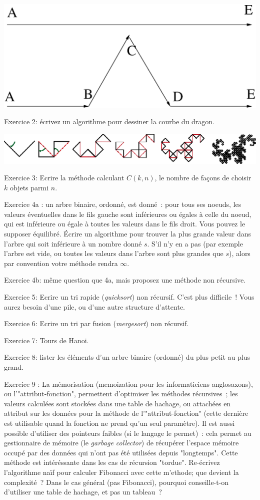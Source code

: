 \documentclass[a4paper]{article}
\begin{document}
\begin{center}
\includegraphics[width=0.4\linewidth]{vonkoch.eps}
\end{center}

Exercice 2:  \'ecrivez un algorithme pour dessiner la courbe du dragon.

\begin{center}
\includegraphics[width=0.8\linewidth]{dragon.eps}
\end{center}

Exercice 3: Ecrire la m\'ethode calculant 
$C(k, n)$, le nombre de fa\c{c}ons de choisir $k$ objets parmi $n$.

Exercice 4a : un arbre binaire, ordonn\'e, est donn\'e~: pour tous ses noeuds, les valeurs \'eventuelles
dans le fils gauche
sont inf\'erieures ou \'egales \`a celle du noeud, qui est inf\'erieure ou \'egale \`a toutes les 
valeurs dans le fils droit. Vous pouvez le supposer \'equilibr\'e. 
\'Ecrire un algorithme pour trouver la plus grande valeur dans l'arbre qui soit inf\'erieure
\`a un nombre donn\'e   $s$. S'il n'y en a pas (par exemple l'arbre est vide, ou toutes les valeurs dans l'arbre sont plus grandes que $s$), alors par convention votre m\'ethode rendra $\infty$.

Exercice 4b: m\^eme question que 4a, mais proposez une m\'ethode non r\'ecursive.


Exercice 5: Ecrire un tri rapide ({\it quicksort}) non r\'ecursif. C'est plus difficile~!
Vous aurez besoin d'une pile,
ou d'une autre structure d'attente.

Exercice 6: Ecrire un tri par fusion ({\it mergesort}) non r\'ecursif.

Exercice 7: Tours de Hanoi.

Exercice 8: lister les \'el\'ements d'un arbre binaire (ordonn\'e) du plus petit au plus grand.

Exercice 9 : La m\'emorisation (memoization pour les informaticiens anglosaxons), ou l'"attribut-fonction",
permettent d'optimiser les m\'ethodes r\'ecursives~; les valeurs calcul\'ees sont stock\'ees 
dans une table de hachage, ou attach\'ees en attribut sur les  donn\'ees pour la m\'ethode
de l'"attribut-fonction" (cette derni\`ere est utilisable quand 
la fonction ne prend qu'un seul param\`etre). Il est aussi possible
d'utiliser des pointeurs faibles (si le langage le permet)~: cela permet au 
gestionnaire de m\'emoire (le {\it garbage collector}) de r\'ecup\'erer 
l'espace m\'emoire occup\'e par des donn\'ees
qui n'ont pas \'et\'e utilis\'ees depuis "longtemps". Cette m\'ethode est 
int\'er\'essante dans les cas de r\'ecursion "tordue". Re-\'ecrivez l'algorithme
na\"if pour calculer Fibonacci avec cette m'ethode; que devient la complexit\'e~? 
Dans le cas g\'en\'eral (pas Fibonacci), pourquoi conseille-t-on
d'utiliser une table de hachage, et pas un tableau~? 
\end{document}
